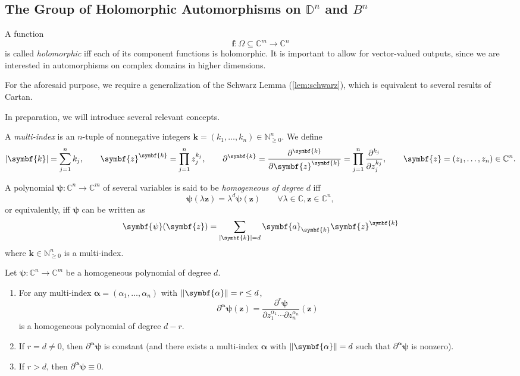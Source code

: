 \subsection{The Group of Holomorphic Automorphisms on \texorpdfstring{\(\mathbb{D}^n\)}{the Unit Polydisk} and \texorpdfstring{\(B^n\)}{the Unit Ball}}
A function \[\symbf{f}:\Omega\subseteq\mathbb{C}^m\to\mathbb{C}^n\] is called \textit{holomorphic} iff each of its component functions is holomorphic. It is important to allow for vector-valued outputs, since we are interested in automorphisms on complex domains in higher dimensions.

For the aforesaid purpose, we require a generalization of the Schwarz Lemma (\cref{lem:schwarz}), which is equivalent to several results of Cartan.

In preparation, we will introduce several relevant concepts.
\begin{definition}\label{def:multiindex}
    A \textit{multi-index} is an \(n\)-tuple of nonnegative integers \(\symbf{k}=(k_1,\ldots,k_n)\in\mathbb{N}_{\geq0}^n\).
    We define
    \[\abs{\symbf{k}}=\sum_{j=1}^n k_j,\qquad\symbf{z}^{\symbf{k}}=\prod_{j=1}^n z_j^{k_j},\qquad\partial^{\symbf{k}}=\pdv[\symbf{k}]{}{\symbf{z}}=\prod_{j=1}^n\pdv[k_j]{z_j},\qquad\symbf{z}=\qty(z_1,\dots,z_n)\in\mathbb{C}^n.\]
\end{definition}
\begin{definition}\label{def:homogeneouspolynomial}
    A polynomial \(\symbf{\psi}:\mathbb{C}^n\to\mathbb{C}^m\) of several variables is said to be \textit{homogeneous of degree \(d\)} iff
    \[\symbf{\psi}(\lambda\symbf{z})=\lambda^d\symbf{\psi}(\symbf{z})\qquad\forall\lambda\in\mathbb{C},\symbf{z}\in\mathbb{C}^n,\]
    or equivalently, iff \(\symbf{\psi}\) can be written as
    \[\symbf{\psi}(\symbf{z})=\sum_{\abs{\symbf{k}}=d}\symbf{a}_{\symbf{k}}\symbf{z}^{\symbf{k}}\] where \(\symbf{k}\in\mathbb{N}_{\ge0}^n\) is a multi-index.
\end{definition}
\begin{proposition}\label{prop:homogeneouspolynomialderivatives}
    Let \(\symbf{\psi}:\mathbb{C}^n\to\mathbb{C}^m\) be a homogeneous polynomial of degree \(d\).
    \begin{enumerate}
        \item For any multi-index \(\symbf{\alpha}=(\alpha_1,\ldots,\alpha_n)\) with \(\norm{\symbf{\alpha}}=r\leq d\), \[\partial^{\symbf{\alpha}}\symbf{\psi}(\symbf{z})=\frac{\partial^r\symbf{\psi}}{\partial z_1^{\alpha_1}\cdots\partial z_n^{\alpha_n}}(\symbf{z})\] is a homogeneous polynomial of degree \(d-r\).\label{itm:homogeneouspolynomialderivatives_less}
        \item If \(r=d\neq 0\), then \(\partial^{\symbf{\alpha}}\symbf{\psi}\) is constant (and there exists a multi-index \(\symbf{\alpha}\) with \(\norm{\symbf{\alpha}}=d\) such that \(\partial^{\symbf{\alpha}}\symbf{\psi}\) is nonzero).\label{itm:homogeneouspolynomialderivatives_equality}
        \item If \(r>d\), then \(\partial^{\symbf{\alpha}}\symbf{\psi}\equiv 0\).\label{itm:homogeneouspolynomialderivatives_greater}
    \end{enumerate}
\end{proposition}
